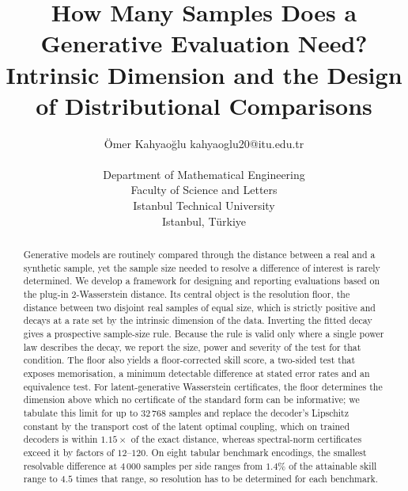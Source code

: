 \documentclass[twoside,11pt]{article}
\theoremstyle{plain}
\theoremstyle{definition}
\theoremstyle{remark}
\begin{document}
\title{How Many Samples Does a Generative Evaluation Need?\\
Intrinsic Dimension and the Design of Distributional Comparisons}

\author{\name \"Omer Kahyao\u{g}lu \email \textnormal{kahyaoglu20@itu.edu.tr} \\
        \\
       \addr Department of Mathematical Engineering\\
       Faculty of Science and Letters\\
       Istanbul Technical University\\
       Istanbul, T\"urkiye}

\maketitle

\begin{abstract}%
Generative models are routinely compared through the distance between a
real and a synthetic sample, yet the sample size needed to resolve a
difference of interest is rarely determined. We develop a framework for
designing and reporting evaluations based on the plug-in 2-Wasserstein
distance. Its central object is the resolution floor, the distance between
two disjoint real samples of equal size, which is strictly positive and
decays at a rate set by the intrinsic dimension of the data. Inverting the
fitted decay gives a prospective sample-size rule. Because the rule is valid
only where a single power law describes the decay, we report the size, power
and severity of the test for that condition. The floor also yields a
floor-corrected skill score, a two-sided test that exposes memorisation, a
minimum detectable difference at stated error rates and an equivalence test.
For latent-generative Wasserstein certificates, the floor determines the
dimension above which no certificate of the standard form can be
informative; we tabulate this limit for up to $32\,768$ samples and replace
the decoder's Lipschitz constant by the transport cost of the latent optimal
coupling, which on trained decoders is within $1.15\times$ of the exact
distance, whereas spectral-norm certificates exceed it by factors of
$12$--$120$. On eight tabular benchmark encodings, the smallest resolvable
difference at $4\,000$ samples per side ranges from $1.4\%$ of the
attainable skill range to $4.5$ times that range, so resolution has to be
determined for each benchmark.
\end{abstract}
\end{document}
